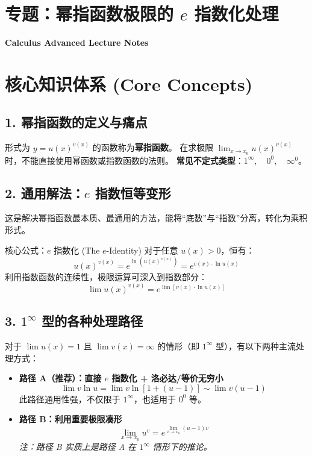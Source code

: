 \documentclass[12pt, a4paper]{article}
\begin{document}
\section*{\centering \huge 专题：幂指函数极限的 $e$ 指数化处理}
\begin{center}
    \large \textbf{Calculus Advanced Lecture Notes}
\end{center}
\vspace{1em}

\section{核心知识体系 (Core Concepts)}

\subsection{1. 幂指函数的定义与痛点}
形式为 $y = u(x)^{v(x)}$ 的函数称为\textbf{幂指函数}。
在求极限 $\lim_{x \to x_0} u(x)^{v(x)}$ 时，不能直接使用幂函数或指数函数的法则。
\textbf{常见不定式类型}：$1^\infty, \quad 0^0, \quad \infty^0$。

\subsection{2. 通用解法：$e$ 指数恒等变形}
这是解决幂指函数最本质、最通用的方法，能将“底数”与“指数”分离，转化为乘积形式。

\begin{conceptbox}{核心公式：$e$ 指数化 (The $e$-Identity)}
对于任意 $u(x) > 0$，恒有：
\[
u(x)^{v(x)} = e^{\ln \left( u(x)^{v(x)} \right)} = e^{v(x) \cdot \ln u(x)}
\]
利用指数函数的连续性，极限运算可深入到指数部分：
\[
\lim u(x)^{v(x)} = e^{\lim \left[ v(x) \cdot \ln u(x) \right]}
\]
\end{conceptbox}

\subsection{3. $1^\infty$ 型的各种处理路径}
对于 $\lim u(x) = 1$ 且 $\lim v(x) = \infty$ 的情形（即 $1^\infty$ 型），有以下两种主流处理方式：

\begin{itemize}
    \item \textbf{路径 A（推荐）：直接 $e$ 指数化 + 洛必达/等价无穷小}
    \[
    \lim v \ln u = \lim v \ln[1 + (u-1)] \sim \lim v(u-1)
    \]
    此路径通用性强，不仅限于 $1^\infty$，也适用于 $0^0$ 等。
    
    \item \textbf{路径 B：利用重要极限凑形}
    \[
    \lim_{x \to x_0} u^v = e^{\lim_{x \to x_0} (u-1)v}
    \]
    \textit{注：路径 B 实质上是路径 A 在 $1^\infty$ 情形下的推论。}
\end{itemize}
\end{document}

